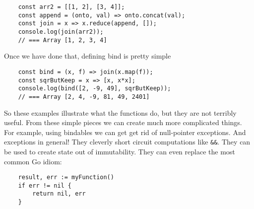 \begin{verbatim}
    const arr2 = [[1, 2], [3, 4]];
    const append = (onto, val) => onto.concat(val);
    const join = x => x.reduce(append, []);
    console.log(join(arr2));
    // === Array [1, 2, 3, 4]
\end{verbatim}
Once we have done that, defining bind is pretty simple
\begin{verbatim}
    const bind = (x, f) => join(x.map(f));
    const sqrButKeep = x => [x, x*x];
    console.log(bind([2, -9, 49], sqrButKeep));
    // === Array [2, 4, -9, 81, 49, 2401]
\end{verbatim}

So these examples illustrate what the functions do,
but they are not terribly useful.
From these simple pieces we can create much
more complicated things.
For example, using bindables we can get get rid of null-pointer exceptions.
And exceptions in general!
They cleverly short circuit computations like \texttt{\&\&}.
They can be used to create state out of immutability.
They can even replace the most common Go idiom:
\begin{verbatim}
    result, err := myFunction()
    if err != nil {
        return nil, err
    }
\end{verbatim}

